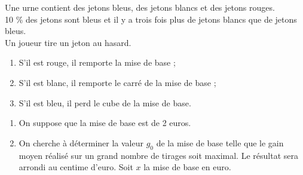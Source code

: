 \documentclass[a4paper,11pt,exos]{nsi} %
\begin{document}
\exo{}
Une urne contient des jetons bleus, des jetons blancs et des jetons rouges.\\
10 \% des jetons sont bleus et il y a trois fois plus de jetons blancs que de jetons bleus.\\
Un joueur tire un jeton au hasard.
\begin{enumerate}[label=\textbullet]
	\item 	S'il est rouge, il remporte la mise de base ;
	\item 	S'il est blanc, il remporte le carré de la mise de base ;
	\item	S'il est bleu, il perd le cube de la mise de base.
\end{enumerate}
\begin{enumerate}
	\item 	On suppose que la mise de base est de 2 euros.
	\item 	On cherche à déterminer la valeur $g_0$	de la mise de base telle que le gain moyen réalisé sur un grand nombre de tirages soit maximal. Le résultat sera arrondi au centime d’euro. Soit $x$ la mise de base en euro.
\end{enumerate}
\end{document}
